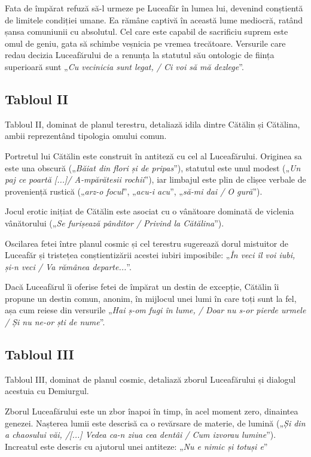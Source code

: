 \documentclass{article}
\newcommand{\qu}[1]{„\emph{#1}”}
\begin{document}
Fata de împărat refuză să-l urmeze pe Luceafăr în lumea lui, devenind conștientă de limitele condiției umane. Ea rămâne captivă în această lume mediocră, ratând șansa comuniunii cu absolutul. Cel care este capabil de sacrificiu suprem este omul de geniu, gata să schimbe veșnicia pe vremea trecătoare. Versurile care redau decizia Luceafărului de a renunța la statutul său ontologic de ființa superioară sunt \qu{Cu vecinicia sunt legat, / Ci voi să mă dezlege}.
\subsection{Tabloul II}
Tabloul II, dominat de planul terestru, detaliază idila dintre Cătălin și Cătălina, ambii reprezentând tipologia omului comun.

Portretul lui Cătălin este construit în antiteză cu cel al Luceafărului. Originea sa este una obscură (\qu{Băiat din flori și de pripas}), statutul este unul modest (\qu{Un paj ce poartă [...]/ A-mpărătesii rochii}), iar limbajul este plin de clișee verbale de proveniență rustică (\qu{arz-o focul}, \qu{acu-i acu}, \qu{să-mi dai / O gură}).

Jocul erotic inițiat de Cătălin este asociat cu o vânătoare dominată de viclenia vânătorului (\qu{Se furișează pânditor / Privind la Cătălina}).

Oscilarea fetei între planul cosmic și cel terestru sugerează dorul mistuitor de Luceafăr și tristețea conștientizării acestei iubiri imposibile: \qu{În veci îl voi iubi, și-n veci / Va rămânea departe...}.

Dacă Luceafărul îi oferise fetei de împărat un destin de excepție, Cătălin îi propune un destin comun, anonim, în mijlocul unei lumi în care toți sunt la fel, așa cum reiese din versurile \qu{Hai ș-om fugi în lume, / Doar nu s-or pierde urmele / Și nu ne-or ști de nume}.

\subsection{Tabloul III}
Tabloul III, dominat de planul cosmic, detaliază zborul Luceafărului și dialogul acestuia cu Demiurgul.

Zborul Luceafărului este un zbor înapoi în timp, în acel moment zero, dinaintea genezei. Nașterea lumii este descrisă ca o revărsare de materie, de lumină (\qu{Și din a chaosului văi, /[...] Vedea ca-n ziua cea dentâi / Cum izvorau lumine}). Increatul este descris cu ajutorul unei antiteze: \qu{Nu e nimic și totuși e}
\end{document}
